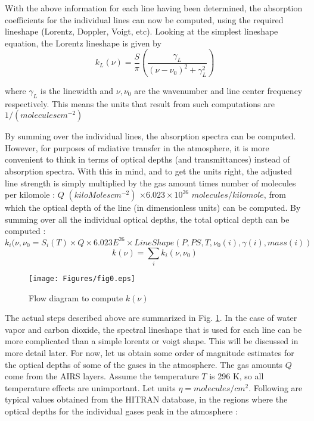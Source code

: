 \documentclass[11pt]{article}
\begin{document}
With the above information for each line having been determined, the 
absorption coefficients for the individual lines can now be computed, 
using the required lineshape (Lorentz, Doppler, Voigt, etc). Looking at 
the simplest lineshape equation, the Lorentz lineshape is given by 
\[
 k_{L}(\nu)=\frac{S}{\pi}\left(\frac{\gamma_{L}}
{(\nu-\nu_{0})^{2}+\gamma_{L}^{2}}\right)
\]

where $\gamma_{L}$ is the linewidth and $\nu,\nu_{0}$ are the wavenumber
and line center frequency respectively. This means the units that result
from such computations are $1/(moleculescm^{-2}) $
 
By summing over the individual lines, the absorption spectra can be 
computed. However, for purposes of radiative transfer in the atmosphere, 
it is more convenient to think in terms of optical depths (and 
transmittances) instead of absorption spectra. With this in mind, and to 
get the units right, the adjusted line strength is simply multiplied by 
the gas amount times number of molecules per kilomole : 
$Q$ $(kiloMolescm^{-2})$ $ \times 6.023 \times 10^{26}$ 
$molecules/kilomole$, from which the optical depth of the line 
(in dimensionless units) can be computed. By summing over all the 
individual optical depths, the total optical depth can be computed : 
\[
k_{i}(\nu,\nu_{0} = S_{i}(T) \times Q \times  6.023E^{26} \times
LineShape(P, PS, T, \nu_{0}(i), \gamma(i), mass(i))
\]
\[ 
k(\nu) = \sum_{i} k_{i}(\nu,\nu_{0})
\] 

\begin{figure}[h]
  \begin{center}\texttt{[image: Figures/fig0.eps]}\end{center}
  \caption[Computing absorption spectra]{Flow diagram to compute $k(\nu)$}
  \label{fig:easy}
\end{figure}

The actual steps described above are summarized in Fig. \ref{fig:easy}. 
In the case of 
water vapor  and carbon dioxide, the spectral lineshape that is used for 
each line can be more complicated than a simple lorentz or voigt shape. 
This will be discussed in more detail later. For now, let us obtain some 
order of magnitude estimates for the optical depths of some of the gases 
in the atmosphere. The gas amounts $Q$ come from the AIRS layers. Assume 
the temperature $T$ is 296 K, so all temperature effects are unimportant. 
Let units $\eta = molecules/cm^{2}$. Following are typical values obtained 
from the HITRAN database, in the regions where the optical depths for the 
individual gases peak in the atmosphere : 
\end{document}
